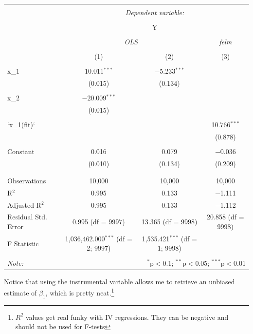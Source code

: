 \documentclass[
]{article}
\begin{document}
\begin{table}[!htbp] \centering 
  \caption{} 
  \label{} 
\begin{tabular}{@{\extracolsep{5pt}}lccc} 
\\[-1.8ex]\hline 
\hline \\[-1.8ex] 
 & \multicolumn{3}{c}{\textit{Dependent variable:}} \\ 
\cline{2-4} 
\\[-1.8ex] & \multicolumn{3}{c}{Y} \\ 
\\[-1.8ex] & \multicolumn{2}{c}{\textit{OLS}} & \textit{felm} \\ 
\\[-1.8ex] & (1) & (2) & (3)\\ 
\hline \\[-1.8ex] 
 x\_1 & 10.011$^{***}$ & $-$5.233$^{***}$ &  \\ 
  & (0.015) & (0.134) &  \\ 
  & & & \\ 
 x\_2 & $-$20.009$^{***}$ &  &  \\ 
  & (0.015) &  &  \\ 
  & & & \\ 
 `x\_1(fit)` &  &  & 10.766$^{***}$ \\ 
  &  &  & (0.878) \\ 
  & & & \\ 
 Constant & 0.016 & 0.079 & $-$0.036 \\ 
  & (0.010) & (0.134) & (0.209) \\ 
  & & & \\ 
\hline \\[-1.8ex] 
Observations & 10,000 & 10,000 & 10,000 \\ 
R$^{2}$ & 0.995 & 0.133 & $-$1.111 \\ 
Adjusted R$^{2}$ & 0.995 & 0.133 & $-$1.112 \\ 
Residual Std. Error & 0.995 (df = 9997) & 13.365 (df = 9998) & 20.858 (df = 9998) \\ 
F Statistic & 1,036,462.000$^{***}$ (df = 2; 9997) & 1,535.421$^{***}$ (df = 1; 9998) &  \\ 
\hline 
\hline \\[-1.8ex] 
\textit{Note:}  & \multicolumn{3}{r}{$^{*}$p$<$0.1; $^{**}$p$<$0.05; $^{***}$p$<$0.01} \\ 
\end{tabular} 
\end{table}

Notice that using the instrumental variable allows me to retrieve an
unbiased estimate of \(\beta_1\), which is pretty neat.\footnote{\(R^2\)
  values get real funky with IV regressions. They can be negative and
  should not be used for F-tests}
\end{document}
